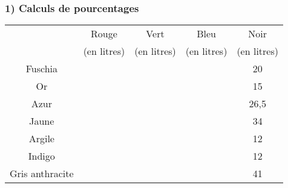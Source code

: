\documentclass[a4paper,10pt]{beamer}
\begin{document}
{\small
\renewcommand{\arraystretch}{1.5}
\begin{frame}
	\frametitle{1) Calculs de pourcentages}

	\begin{tabular}{|c|c|c|c|c|}
		\hline
		                & Rouge       & Vert        & Bleu        & Noir        \\
		                & (en litres) & (en litres) & (en litres) & (en litres) \\ \hline
		Fuschia         &             &             &             & 20          \\ \hline
		Or              &             &             &             & 15          \\ \hline
		Azur            &             &             &             & 26,5        \\ \hline
		Jaune           &             &             &             & 34          \\ \hline
		Argile          &             &             &             & 12          \\ \hline
		Indigo          &             &             &             & 12          \\ \hline
		Gris anthracite &             &             &             & 41          \\ \hline
	\end{tabular}
\end{frame}}
\end{document}
